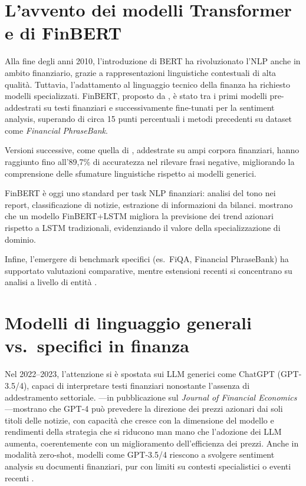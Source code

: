 \section{L'avvento dei modelli Transformer e di FinBERT}

Alla fine degli anni 2010, l'introduzione di BERT \parencite{devlin2018bert} ha rivoluzionato l'NLP anche in ambito finanziario, grazie a rappresentazioni linguistiche contestuali di alta qualità.
Tuttavia, l'adattamento al linguaggio tecnico della finanza ha richiesto modelli specializzati.
FinBERT, proposto da \textcite{araci2019finbert}, è stato tra i primi modelli pre-addestrati su testi finanziari e successivamente fine-tunati per la sentiment analysis, superando di circa 15 punti percentuali i metodi precedenti su dataset come \textit{Financial PhraseBank}.

Versioni successive, come quella di \textcite{huang2022finbert}, addestrate su ampi corpora finanziari, hanno raggiunto fino all'89,7\% di accuratezza nel rilevare frasi negative, migliorando la comprensione delle sfumature linguistiche rispetto ai modelli generici.

FinBERT è oggi uno standard per task NLP finanziari: analisi del tono nei report, classificazione di notizie, estrazione di informazioni da bilanci.
\textcite{gu2024finbert} mostrano che un modello FinBERT+LSTM migliora la previsione dei trend azionari rispetto a LSTM tradizionali, evidenziando il valore della specializzazione di dominio.

Infine, l'emergere di benchmark specifici (es.\ FiQA, Financial PhraseBank) ha supportato valutazioni comparative, mentre estensioni recenti si concentrano su analisi a livello di entità \parencite{tang-etal-2023-finentity}.

\section{Modelli di linguaggio generali vs.\ specifici in finanza}

Nel 2022--2023, l'attenzione si è spostata sui LLM generici come ChatGPT (GPT-3.5/4), capaci di interpretare testi finanziari nonostante l'assenza di addestramento settoriale.
\textcite{lopezlira2024chatgptforecaststockprice}---in pubblicazione sul \textit{Journal of Financial Economics}---mostrano che GPT-4 può prevedere la direzione dei prezzi azionari dai soli titoli delle notizie, con capacità che cresce con la dimensione del modello e rendimenti della strategia che si riducono man mano che l'adozione dei LLM aumenta, coerentemente con un miglioramento dell'efficienza dei prezzi.
Anche in modalità zero-shot, modelli come GPT-3.5/4 riescono a svolgere sentiment analysis su documenti finanziari, pur con limiti su contesti specialistici o eventi recenti \parencite{bdcc8110143}.

